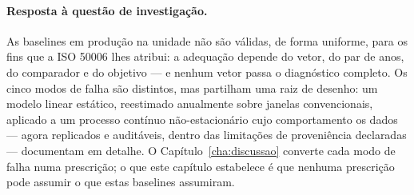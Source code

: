 \paragraph{Resposta à questão de investigação.} As baselines em produção na
unidade não são válidas, de forma uniforme, para os fins que a ISO 50006
lhes atribui: a adequação depende do vetor, do par de anos, do comparador e
do objetivo --- e nenhum vetor passa o diagnóstico completo. Os cinco modos
de falha são distintos, mas partilham uma raiz de desenho: um modelo linear
estático, reestimado anualmente sobre janelas convencionais, aplicado a um
processo contínuo não-estacionário cujo comportamento os dados --- agora
replicados e auditáveis, dentro das limitações de proveniência declaradas ---
documentam em detalhe. O Capítulo~\ref{cha:discussao} converte cada modo de
falha numa prescrição; o que este capítulo estabelece é que nenhuma prescrição pode
assumir o que estas baselines assumiram.

